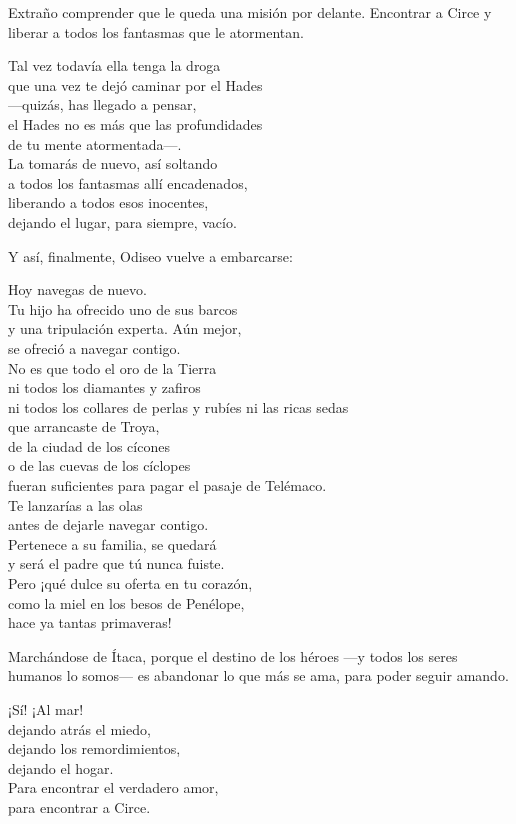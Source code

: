 Extraño comprender que le queda una misión por delante. Encontrar a Circe y liberar a todos los fantasmas que le atormentan.

\begin{versopropio}
Tal vez todavía ella tenga la droga\\
que una vez te dejó caminar por el Hades\\
---quizás, has llegado a pensar,\\
el Hades no es más que las profundidades\\
de tu mente atormentada---.\\
La tomarás de nuevo, así soltando\\
a todos los fantasmas allí encadenados,\\
liberando a todos esos inocentes,\\
dejando el lugar, para siempre, vacío.
\end{versopropio}

Y así, finalmente, Odiseo vuelve a embarcarse:

\begin{versopropio}
Hoy navegas de nuevo.\\
Tu hijo ha ofrecido uno de sus barcos\\
y una tripulación experta. Aún mejor,\\
se ofreció a navegar contigo.\\
No es que todo el oro de la Tierra\\
ni todos los diamantes y zafiros\\
ni todos los collares de perlas y rubíes ni las ricas sedas\\
que arrancaste de Troya,\\
de la ciudad de los cícones\\
o de las cuevas de los cíclopes\\
fueran suficientes para pagar el pasaje de Telémaco.\\
Te lanzarías a las olas\\
antes de dejarle navegar contigo.\\
Pertenece a su familia, se quedará\\
y será el padre que tú nunca fuiste.\\
Pero ¡qué dulce su oferta en tu corazón,\\
como la miel en los besos de Penélope,\\
hace ya tantas primaveras!
\end{versopropio}

Marchándose de Ítaca, porque el destino de los héroes ---y todos los seres humanos lo somos--- es abandonar lo que más se ama, para poder seguir amando.

\begin{versopropio}
¡Sí! ¡Al mar!\\
dejando atrás el miedo,\\
dejando los remordimientos,\\
dejando el hogar.\\
Para encontrar el verdadero amor,\\
para encontrar a Circe.
\end{versopropio}

